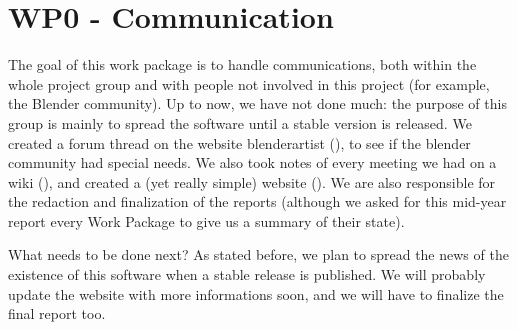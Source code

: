\section{WP0 - Communication}

The goal of this work package is to handle communications, both within the whole project group and with people not involved in this project (for example, the Blender community). Up to now, we have not done much: the purpose of this group is mainly to spread the software until a stable version is released. We created a forum thread on the website blenderartist (\cite{blenderartist}), to see if the blender community had special needs. We also took notes of every meeting we had on a wiki (\cite{comptesrendus}), and created a (yet really simple) website (\cite{site}). We are also responsible for the redaction and finalization of the reports (although we asked for this mid-year report every Work Package to give us a summary of their state).

\par What needs to be done next? As stated before, we plan to spread the news of the existence of this software when a stable release is published. We will probably update the website with more informations soon, and we will have to finalize the final report too.
